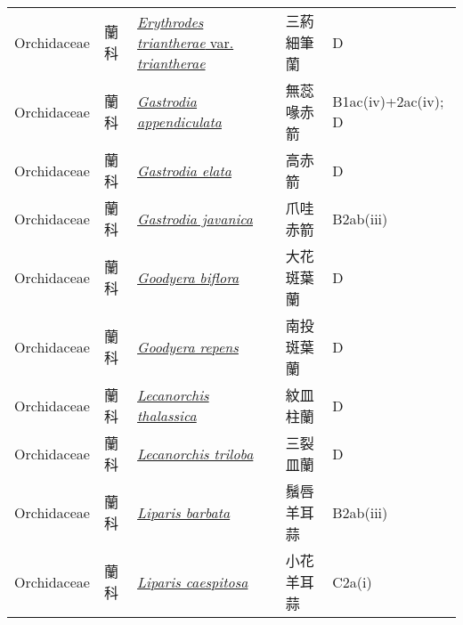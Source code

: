 {\begin{longtable}{p{2.5cm}p{2.5cm}p{4.5cm}p{2.5cm}p{3cm}}
    Orchidaceae & 蘭科 & \href{http://www.theplantlist.org/tpl1.1/search?q=Erythrodes+triantherae+var.+triantherae}{\textit{Erythrodes triantherae} var. \textit{triantherae} } & 三葯細筆蘭 & D \index{Erythrodes@\textit{Erythrodes}!triantherae@\textit{triantherae}!var. triantherae@var. \textit{triantherae}}  \index{三葯細筆蘭} \\
    Orchidaceae & 蘭科 & \href{http://www.theplantlist.org/tpl1.1/search?q=Gastrodia+appendiculata}{\textit{Gastrodia appendiculata} } & 無蕊喙赤箭 & B1ac(iv)+2ac(iv); D \index{Gastrodia@\textit{Gastrodia}!appendiculata@\textit{appendiculata}}  \index{無蕊喙赤箭} \\
    Orchidaceae & 蘭科 & \href{http://www.theplantlist.org/tpl1.1/search?q=Gastrodia+elata}{\textit{Gastrodia elata} } & 高赤箭 & D \index{Gastrodia@\textit{Gastrodia}!elata@\textit{elata}}  \index{高赤箭} \\
    Orchidaceae & 蘭科 & \href{http://www.theplantlist.org/tpl1.1/search?q=Gastrodia+javanica}{\textit{Gastrodia javanica} } & 爪哇赤箭 & B2ab(iii) \index{Gastrodia@\textit{Gastrodia}!javanica@\textit{javanica}}  \index{爪哇赤箭} \\
    Orchidaceae & 蘭科 & \href{http://www.theplantlist.org/tpl1.1/search?q=Goodyera+biflora}{\textit{Goodyera biflora} } & 大花斑葉蘭 & D \index{Goodyera@\textit{Goodyera}!biflora@\textit{biflora}}  \index{大花斑葉蘭} \\
    Orchidaceae & 蘭科 & \href{http://www.theplantlist.org/tpl1.1/search?q=Goodyera+repens}{\textit{Goodyera repens} } & 南投斑葉蘭 & D \index{Goodyera@\textit{Goodyera}!repens@\textit{repens}}  \index{南投斑葉蘭} \\
    Orchidaceae & 蘭科 & \href{http://www.theplantlist.org/tpl1.1/search?q=Lecanorchis+thalassica}{\textit{Lecanorchis thalassica} } & 紋皿柱蘭 & D \index{Lecanorchis@\textit{Lecanorchis}!thalassica@\textit{thalassica}}  \index{紋皿柱蘭} \\
    Orchidaceae & 蘭科 & \href{http://www.theplantlist.org/tpl1.1/search?q=Lecanorchis+triloba}{\textit{Lecanorchis triloba} } & 三裂皿蘭 & D \index{Lecanorchis@\textit{Lecanorchis}!triloba@\textit{triloba}}  \index{三裂皿蘭} \\
    Orchidaceae & 蘭科 & \href{http://www.theplantlist.org/tpl1.1/search?q=Liparis+barbata}{\textit{Liparis barbata} } & 鬚唇羊耳蒜 & B2ab(iii) \index{Liparis@\textit{Liparis}!barbata@\textit{barbata}}  \index{鬚唇羊耳蒜} \\
    Orchidaceae & 蘭科 & \href{http://www.theplantlist.org/tpl1.1/search?q=Liparis+caespitosa}{\textit{Liparis caespitosa} } & 小花羊耳蒜 & C2a(i) \index{Liparis@\textit{Liparis}!caespitosa@\textit{caespitosa}}  \index{小花羊耳蒜} \\

\end{longtable}}
